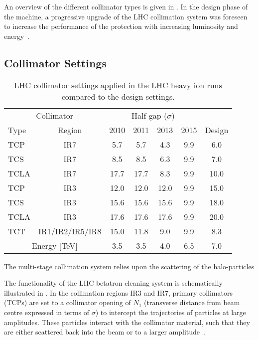 An overview of the different collimator types is given in . In the design phase of the machine, a progressive upgrade of the LHC collimation system was foreseen to increase the performance of the protection with increasing luminosity and energy~\citedr. 


 \subsection{Collimator Settings}


\begin{table}[htbp]
\caption{LHC collimator settings applied in the LHC heavy ion runs compared to the design settings. }
\begin{center}
\begin{tabular}{lcccccc}
\toprule
\midrule
 \multicolumn{2}{c}{Collimator} & \multicolumn{4}{c}{Half gap ($\sigma$)} \\
Type & Region & 2010 & 2011 & 2013 & 2015 & Design \\ \midrule
TCP  & IR7 & 5.7  & 5.7  & 4.3  & 9.9 & 6.0  \\
TCS  & IR7 & 8.5  & 8.5  & 6.3  & 9.9 & 7.0  \\
TCLA & IR7 & 17.7 & 17.7 & 8.3  & 9.9 & 10.0 \\ \midrule
TCP  & IR3 & 12.0 & 12.0 & 12.0 & 9.9 & 15.0 \\
TCS  & IR3 & 15.6 & 15.6 & 15.6 & 9.9 & 18.0 \\
TCLA & IR3 & 17.6 & 17.6 & 17.6 & 9.9 & 20.0 \\ \midrule
TCT  & IR1/IR2/IR5/IR8    & 15.0 & 11.8 &  9.0 & 9.9 & 8.3  \\ \midrule 
 \multicolumn{2}{c}{Energy [TeV]} & 3.5 & 3.5 & 4.0 & 6.5 & 7.0 \\
\bottomrule
\end{tabular}
\end{center}
\label{tab:14070901}
\end{table}

The multi-stage collimation system relies upon the scattering of the halo-particles 

The functionality of the LHC betatron cleaning system is schematically illustrated in . In the collimation regions IR3 and IR7, primary collimators (TCPs) are set to a collimator opening of $N_1$ (transverse distance from beam centre expressed in terms of $\sigma$) to intercept the trajectories of particles at large amplitudes. These particles interact with the collimator material, such that they are either scattered back into the beam or to a larger amplitude~\citedr.\

